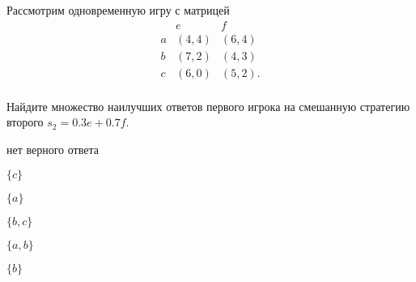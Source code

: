 
\begin{question}
Рассмотрим одновременную игру с матрицей \[
\begin{matrix}
   & e & f \\
a  & (4, 4) & (6, 4) \\
b  & (7, 2) & (4, 3) \\ 
c  & (6, 0) & (5, 2). \\ 
\end{matrix}
\]

Найдите множество наилучших ответов первого игрока на смешанную
стратегию второго \(s_2 = 0.3e + 0.7f\).
\begin{answerlist}
  \item нет верного ответа
  \item \(\{c\}\)
  \item \(\{a\}\)
  \item \(\{b, c\}\)
  \item \(\{a, b\}\)
  \item \(\{b\}\)
\end{answerlist}
\end{question}


